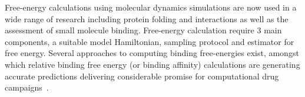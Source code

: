 
Free-energy calculations using molecular dynamics simulations are now used in 
a wide range of research including protein folding and interactions as well as
the assessment of small molecule binding. Free-energy calculation require 
3 main components, a suitable model Hamiltonian, sampling protocol and estimator 
for free energy. Several approaches to computing binding free-energies exist, 
amongst which relative binding free energy (or binding affinity) calculations 
are generating accurate predictions delivering considerable promise for 
computational drug campaigns~\cite{Karplus2005}. 



